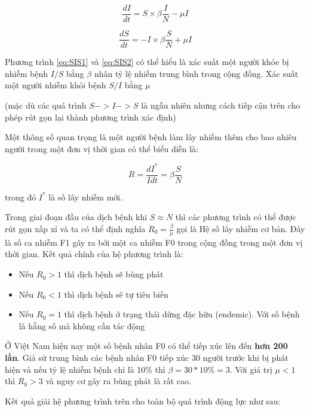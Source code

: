 \documentclass[]{book}
\providecommand{\tightlist}{%
  \setlength{\itemsep}{0pt}\setlength{\parskip}{0pt}}
\begin{document}
\begin{equation} 
  \frac{dI}{dt} = S\times\beta \frac{I}{N}-\mu I
  \label{eq:SIS1}
\end{equation}

\begin{equation} 
  \frac{dS}{dt} = -I\times\beta \frac{S}{N}+\mu I
  \label{eq:SIS2}
\end{equation}

Phương trình \eqref{eq:SIS1} và \eqref{eq:SIS2} có thể hiểu là xác suất một
người khỏe bị nhiễm bệnh \(I/S\) bằng \(\beta\) nhân tỷ lệ nhiễm trung
bình trong cộng đồng. Xác suất một người nhiễm khỏi bệnh \(S/I\) bằng
\(\mu\)

(mặc dù các quá trình \(S -> I -> S\) là ngẫu nhiên nhưng cách tiếp cận
trên cho phép rút gọn lại thành phương trình xác định)

Một thông số quan trọng là một người bệnh làm lây nhiễm thêm cho bao
nhiêu người trong một đơn vị thời gian có thể biểu diễn là:

\begin{equation*} 
  R = \frac{dI^*}{Idt} = \beta \frac{S}{N}
  \label{eq:SIS2}
\end{equation*}

trong đó \(I^*\) là số lây nhiễm mới.

Trong giai đoạn đầu của dịch bệnh khi \(S\approx N\) thì các phương
trình có thể được rút gọn xấp xỉ và ta có thể định nghĩa
\(R_0 = \frac{\beta}{\mu}\) gọi là Hệ số lây nhiễm cơ bản. Đây là số ca
nhiễm F1 gây ra bởi một ca nhiễm F0 trong cộng đồng trong một đơn vị
thời gian. Kết quả chính của hệ phương trình là:

\begin{itemize}
\tightlist
\item
  Nếu \(R_0 > 1\) thì dịch bệnh sẽ bùng phát
\item
  Nếu \(R_0 < 1\) thì dịch bệnh sẽ tự tiêu biến
\item
  Nếu \(R_0 = 1\) thì dịch bệnh ở trạng thái dừng đặc hữu (endemic). Với
  số bệnh là hằng số mà không cần tác động
\end{itemize}

Ở Việt Nam hiện nay một số bệnh nhân F0 có thể tiếp xúc lên đến
\textbf{hơn 200 lần}. Giả sử trung bình các bệnh nhân F0 tiếp xúc 30
người trước khi bị phát hiện và nếu tỷ lệ nhiễm bệnh chỉ là 10\% thì
\(\beta = 30* 10\% = 3\). Với giá trị \(\mu < 1\) thì \(R_0 > 3\) và
nguy cơ gây ra bùng phát là rất cao.

Kết quả giải hệ phương trình trên cho toàn bộ quá trình động lực như
sau:
\end{document}
